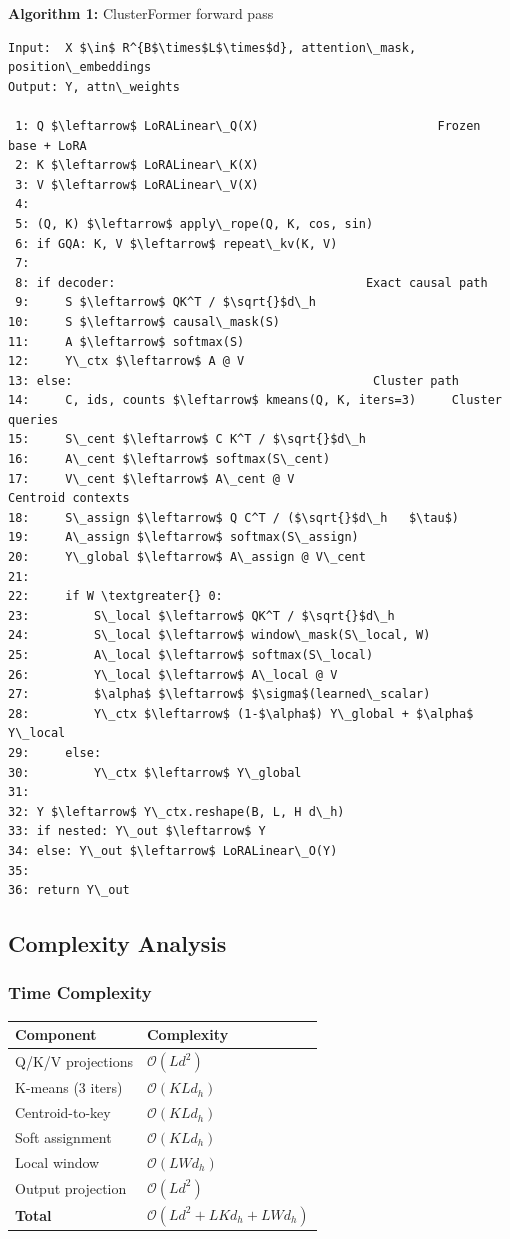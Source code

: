 \textbf{Algorithm 1:} ClusterFormer forward pass
\begin{lstlisting}
Input:  X $\in$ R^{B$\times$L$\times$d}, attention\_mask, position\_embeddings
Output: Y, attn\_weights

 1: Q $\leftarrow$ LoRALinear\_Q(X)                         Frozen base + LoRA
 2: K $\leftarrow$ LoRALinear\_K(X)
 3: V $\leftarrow$ LoRALinear\_V(X)
 4:
 5: (Q, K) $\leftarrow$ apply\_rope(Q, K, cos, sin)
 6: if GQA: K, V $\leftarrow$ repeat\_kv(K, V)
 7:
 8: if decoder:                                   Exact causal path
 9:     S $\leftarrow$ QK^T / $\sqrt{}$d\_h
10:     S $\leftarrow$ causal\_mask(S)
11:     A $\leftarrow$ softmax(S)
12:     Y\_ctx $\leftarrow$ A @ V
13: else:                                          Cluster path
14:     C, ids, counts $\leftarrow$ kmeans(Q, K, iters=3)     Cluster queries
15:     S\_cent $\leftarrow$ C K^T / $\sqrt{}$d\_h
16:     A\_cent $\leftarrow$ softmax(S\_cent)
17:     V\_cent $\leftarrow$ A\_cent @ V                         Centroid contexts
18:     S\_assign $\leftarrow$ Q C^T / ($\sqrt{}$d\_h   $\tau$)
19:     A\_assign $\leftarrow$ softmax(S\_assign)
20:     Y\_global $\leftarrow$ A\_assign @ V\_cent
21:
22:     if W \textgreater{} 0:
23:         S\_local $\leftarrow$ QK^T / $\sqrt{}$d\_h
24:         S\_local $\leftarrow$ window\_mask(S\_local, W)
25:         A\_local $\leftarrow$ softmax(S\_local)
26:         Y\_local $\leftarrow$ A\_local @ V
27:         $\alpha$ $\leftarrow$ $\sigma$(learned\_scalar)
28:         Y\_ctx $\leftarrow$ (1-$\alpha$) Y\_global + $\alpha$ Y\_local
29:     else:
30:         Y\_ctx $\leftarrow$ Y\_global
31:
32: Y $\leftarrow$ Y\_ctx.reshape(B, L, H d\_h)
33: if nested: Y\_out $\leftarrow$ Y
34: else: Y\_out $\leftarrow$ LoRALinear\_O(Y)
35:
36: return Y\_out
\end{lstlisting}

\subsection{Complexity Analysis}

\subsubsection{Time Complexity}

\begin{table}[H]
\centering
\small
\begin{tabular}{ll}
\toprule
\textbf{Component} & \textbf{Complexity} \\
\midrule
Q/K/V projections & $\mathcal{O}(L d^2)$ \\
K-means (3 iters) & $\mathcal{O}(K L d_h)$ \\
Centroid-to-key & $\mathcal{O}(K L d_h)$ \\
Soft assignment & $\mathcal{O}(K L d_h)$ \\
Local window & $\mathcal{O}(L W d_h)$ \\
Output projection & $\mathcal{O}(L d^2)$ \\
\textbf{Total} & $\mathcal{O}(L d^2 + L K d_h + L W d_h)$ \\
\bottomrule
\end{tabular}
\end{table}

